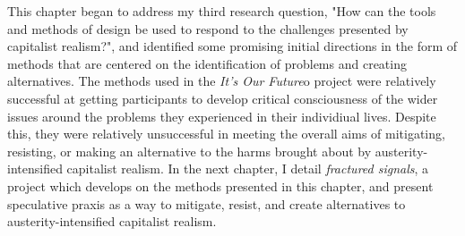 This chapter began to address my third research question, "How can the tools and methods of design be used to respond to the challenges presented by capitalist realism?", and identified some promising initial directions in the form of methods that are centered on the identification of problems and creating alternatives. The methods used in the \textit{It's Our Future}o project were relatively successful at getting participants to develop critical consciousness of the wider issues around the problems they experienced in their individiual lives. Despite this, they were relatively unsuccessful in meeting the overall aims of mitigating, resisting, or making an alternative to the harms brought about by austerity-intensified capitalist realism. In the next chapter, I detail \textit{fractured signals}, a project which develops on the methods presented in this chapter, and present speculative praxis as a way to mitigate, resist, and create alternatives to austerity-intensified capitalist realism. 